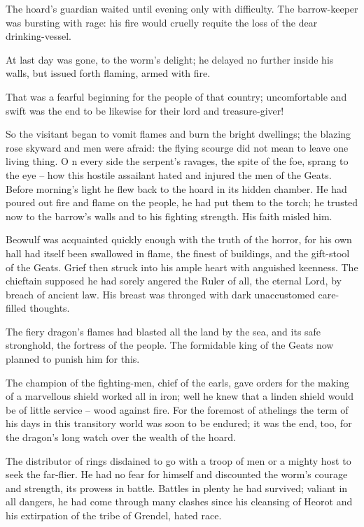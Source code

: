 \documentclass[a4paper]{article}
\begin{document}
{The hoard’s guardian
waited until evening only with difficulty.
The barrow-keeper was bursting with rage:
his fire would cruelly requite the loss
of the dear drinking-vessel.

At last day was gone,
to the worm’s delight; he delayed no further
inside his walls, but issued forth flaming,
armed with fire.

That was a fearful beginning
for the people of that country; uncomfortable and swift
was the end to be likewise for their lord and treasure-giver!

So the visitant began to vomit flames
and burn the bright dwellings; the blazing rose skyward
and men were afraid: the flying scourge
did not mean to leave one living thing.
O
n every side the serpent’s ravages,
the spite of the foe, sprang to the eye –
how this hostile assailant hated and injured
the men of the Geats. Before morning’s light
he flew back to the hoard in its hidden chamber.
He had poured out fire and flame on the people,
he had put them to the torch; he trusted now to the barrow’s walls
and to his fighting strength. His faith misled him.

Beowulf was acquainted quickly enough
with the truth of the horror, for his own hall had itself
been swallowed in flame, the finest of buildings,
and the gift-stool of the Geats. Grief then struck
into his ample heart with anguished keenness.
The chieftain supposed he had sorely angered
the Ruler of all, the eternal Lord,
by breach of ancient law. His breast was thronged
with dark unaccustomed care-filled thoughts.

The fiery dragon’s flames had blasted
all the land by the sea, and its safe stronghold,
the fortress of the people. The formidable king
of the Geats now planned to punish him for this.

The champion of the fighting-men, chief of the earls,
gave orders for the making of a marvellous shield
worked all in iron; well he knew
that a linden shield would be of little service
– wood against fire. For the foremost of athelings
the term of his days in this transitory world
was soon to be endured; it was the end, too, for the dragon’s
long watch over the wealth of the hoard.

The distributor of rings disdained to go
with a troop of men or a mighty host
to seek the far-flier. He had no fear for himself
and discounted the worm’s courage and strength,
its prowess in battle. Battles in plenty
he had survived; valiant in all dangers,
he had come through many clashes since his cleansing of Heorot
and his extirpation of the tribe of Grendel, hated race.

}
\end{document}

